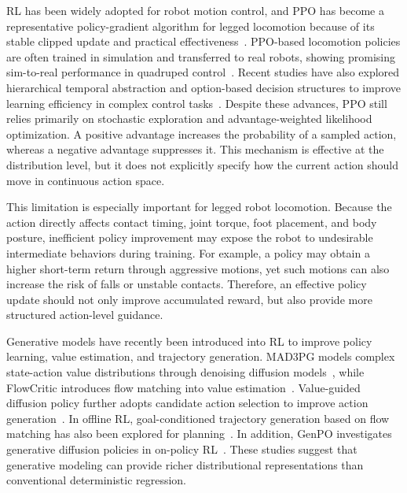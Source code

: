 \documentclass[conference]{IEEEtran}
\begin{document}
RL has been widely adopted for robot motion control, and PPO has become a representative policy-gradient algorithm for legged locomotion because of its stable clipped update and practical effectiveness~\cite{schulman2017ppo,rudin2022learning}. PPO-based locomotion policies are often trained in simulation and transferred to real robots, showing promising sim-to-real performance in quadruped control~\cite{rudin2022learning}. Recent studies have also explored hierarchical temporal abstraction and option-based decision structures to improve learning efficiency in complex control tasks~\cite{diao2025gatoc}. Despite these advances, PPO still relies primarily on stochastic exploration and advantage-weighted likelihood optimization. A positive advantage increases the probability of a sampled action, whereas a negative advantage suppresses it. This mechanism is effective at the distribution level, but it does not explicitly specify how the current action should move in continuous action space.

This limitation is especially important for legged robot locomotion. Because the action directly affects contact timing, joint torque, foot placement, and body posture, inefficient policy improvement may expose the robot to undesirable intermediate behaviors during training. For example, a policy may obtain a higher short-term return through aggressive motions, yet such motions can also increase the risk of falls or unstable contacts. Therefore, an effective policy update should not only improve accumulated reward, but also provide more structured action-level guidance.

Generative models have recently been introduced into RL to improve policy learning, value estimation, and trajectory generation. MAD3PG models complex state-action value distributions through denoising diffusion models~\cite{mad3pg}, while FlowCritic introduces flow matching into value estimation~\cite{flowcritic}. Value-guided diffusion policy further adopts candidate action selection to improve action generation~\cite{zhong2025value}. In offline RL, goal-conditioned trajectory generation based on flow matching has also been explored for planning~\cite{diao2025goal}. In addition, GenPO investigates generative diffusion policies in on-policy RL~\cite{ding2025genpo}. These studies suggest that generative modeling can provide richer distributional representations than conventional deterministic regression.
\end{document}

